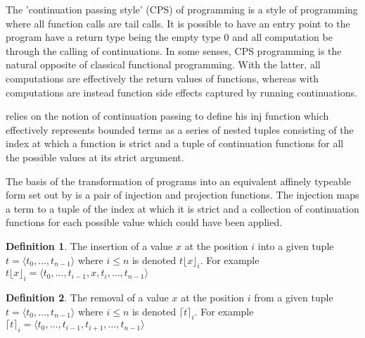 \documentclass[12pt,a4paper]{report}
\theoremstyle{definition}
\newtheorem{definition}{Definition}[chapter]%
\theoremstyle{remark}
\begin{document}
The 'continuation passing style' (CPS) of programming is a style of programming where all function calls are tail calls. It is possible to have an entry point to the program have a return type being the empty type $0$ and all computation be through the calling of continuations. In some senses, CPS programming is the natural opposite of classical functional programming. With the latter, all computations are effectively the return values of functions, whereas with computations are instead function side effects captured by running continuations.

\cite{laird_2007} relies on the notion of continuation passing to define his inj function which effectively represents bounded terms as a series of nested tuples consisting of the index at which a function is strict and a tuple of continuation functions for all the possible values at its strict argument. 

The basis of the transformation of programs into an equivalent affinely typeable form set out by \cite{laird_2007} is a pair of injection and projection functions. The injection maps a term to a tuple of the index at which it is strict and a collection of continuation functions for each possible value which could have been applied.  

\begin{definition}
    The insertion of a value $x$ at the position $i$ into a given tuple $t = \langle t_0, \dots, t_{n-1} \rangle$ where $i \leq n$ is denoted $t\lfloor x \rfloor_i$. For example $t\lfloor x \rfloor_i = \langle t_0, \dots, t_{i-1}, x, t_i, \dots, t_{n-1} \rangle$
\end{definition}

\begin{definition}
    The removal of a value $x$ at the position $i$ from a given tuple $t = \langle t_0, \dots, t_{n-1} \rangle$ where $i \le n$ is denoted $\lceil t \rceil_i$. For example $\lceil t \rceil_i = \langle t_0, \dots, t_{i-1}, t_{i+1}, \dots, t_{n-1} \rangle$
\end{definition}
\end{document}
